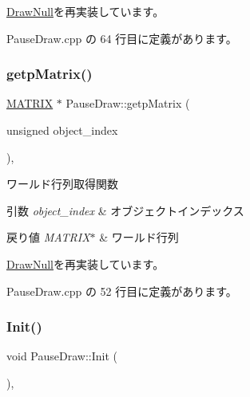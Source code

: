\mbox{\hyperlink{class_draw_null_a0c1efe55fea325ad277594be6fe1e938}{Draw\+Null}}を再実装しています。



 Pause\+Draw.\+cpp の 64 行目に定義があります。

\mbox{\label{class_pause_draw_a36622378926e01e7a401b6e201cb4f16}} 
\subsubsection{\texorpdfstring{getp\+Matrix()}{getpMatrix()}}
{\footnotesize\ttfamily \mbox{\hyperlink{_matrix_8h_a032295cd9fb1b711757c90667278e744}{M\+A\+T\+R\+IX}} $\ast$ Pause\+Draw\+::getp\+Matrix (\begin{DoxyParamCaption}\item[{unsigned}]{object\+\_\+index }\end{DoxyParamCaption})\hspace{0.3cm}{\ttfamily [override]}, {\ttfamily [virtual]}}



ワールド行列取得関数 


\begin{DoxyParams}{引数}
{\em object\+\_\+index} & オブジェクトインデックス \\
\hline
\end{DoxyParams}

\begin{DoxyRetVals}{戻り値}
{\em M\+A\+T\+R\+I\+X$\ast$} & ワールド行列 \\
\hline
\end{DoxyRetVals}


\mbox{\hyperlink{class_draw_null_a9aac059eb3b5d1f77e8bd3aa0647cff9}{Draw\+Null}}を再実装しています。



 Pause\+Draw.\+cpp の 52 行目に定義があります。

\mbox{\label{class_pause_draw_a6d2ea46c8c17f33684b3eaa42913204b}} 
\subsubsection{\texorpdfstring{Init()}{Init()}}
{\footnotesize\ttfamily void Pause\+Draw\+::\+Init (\begin{DoxyParamCaption}{ }\end{DoxyParamCaption})\hspace{0.3cm}{\ttfamily [override]}, {\ttfamily [virtual]}}



